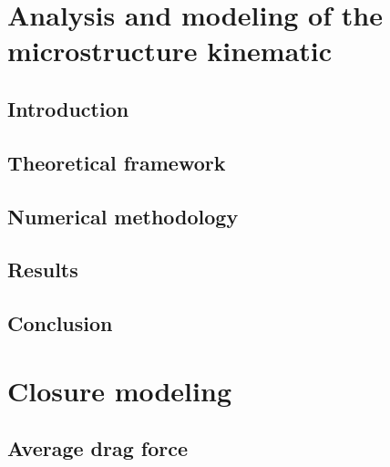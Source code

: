 \documentclass[12pt,a4paper,openany]{My_book}
\begin{document}
\chapter{Analysis and modeling of the microstructure kinematic}
\localtableofcontents

\section{Introduction}


% 

\section{Theoretical framework}
\label{sec:Theory}



\section{Numerical methodology}
\label{sec:methodo}


\section{Results}

\label{sec:results}





% 

\section{Conclusion}



\chapter{Closure modeling}
\label{chap:mono-disperse}
\localtableofcontents


\section{Average drag force}


\end{document}
